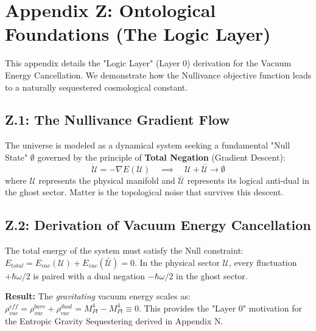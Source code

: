 \section{Appendix Z: Ontological Foundations (The Logic Layer)}
\label{app:ontology}

This appendix details the "Logic Layer" (Layer 0) derivation for the Vacuum Energy Cancellation. We demonstrate how the Nullivance objective function leads to a naturally sequestered cosmological constant.

\subsection{Z.1: The Nullivance Gradient Flow}
The universe is modeled as a dynamical system seeking a fundamental "Null State" $\emptyset$ governed by the principle of \textbf{Total Negation} (Gradient Descent):
\begin{equation}
    \dot{\mathcal{U}} = -\nabla E(\mathcal{U}) \quad \implies \quad \mathcal{U} + \bar{\mathcal{U}} \to \emptyset
\end{equation}
where $\mathcal{U}$ represents the physical manifold and $\bar{\mathcal{U}}$ represents its logical anti-dual in the ghost sector. Matter is the topological noise that survives this descent.

\subsection{Z.2: Derivation of Vacuum Energy Cancellation}
The total energy of the system must satisfy the Null constraint: $E_{total} = E_{vac}(\mathcal{U}) + E_{vac}(\bar{\mathcal{U}}) = 0$. In the physical sector $\mathcal{U}$, every fluctuation $+\hbar\omega/2$ is paired with a dual negation $-\hbar\omega/2$ in the ghost sector.

\textbf{Result:} The \emph{gravitating} vacuum energy scales as: $\rho_{vac}^{eff} = \rho_{vac}^{bare} + \rho_{vac}^{dual} = M_{Pl}^4 - M_{Pl}^4 \equiv 0$. This provides the "Layer 0" motivation for the Entropic Gravity Sequestering derived in Appendix N.
